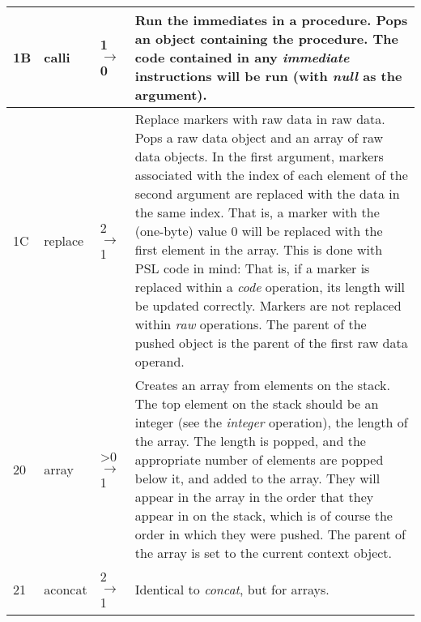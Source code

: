 \begin{longtable}{ | l | l | l | X | }
\hline
%
%
%
1B & calli & 1 $\rightarrow$ 0 & Run the immediates in a procedure. Pops an object containing the procedure. The code contained in any \textit{immediate} instructions will be run (with \textit{null} as the argument). \\
\hline
1C & replace & 2 $\rightarrow$ 1 & Replace markers with raw data in raw data. Pops a raw data object and an array of raw data objects. In the first argument, markers associated with the index of each element of the second argument are replaced with the data in the same index. That is, a marker with the (one-byte) value 0 will be replaced with the first element in the array. This is done with PSL code in mind: That is, if a marker is replaced within a \textit{code} operation, its length will be updated correctly. Markers are not replaced within \textit{raw} operations. The parent of the pushed object is the parent of the first raw data operand. \\
\hline
20 & array & >0 $\rightarrow$ 1 & Creates an array from elements on the stack. The top element on the stack should be an integer (see the \textit{integer} operation), the length of the array. The length is popped, and the appropriate number of elements are popped below it, and added to the array. They will appear in the array in the order that they appear in on the stack, which is of course the order in which they were pushed. The parent of the array is set to the current context object. \\
\hline
21 & aconcat & 2 $\rightarrow$ 1 & Identical to \textit{concat}, but for arrays. \\

\end{longtable}
